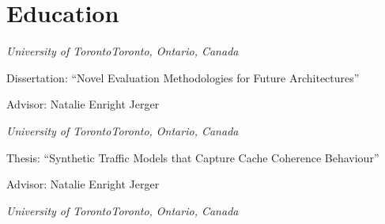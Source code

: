 \section{\sc Education}

{\textit{University of Toronto}}{\textit{Toronto, Ontario, Canada}}
{
  Dissertation: ``Novel Evaluation Methodologies for Future Architectures''

  Advisor:  Natalie Enright Jerger
}

{\textit{University of Toronto}}{\textit{Toronto, Ontario, Canada}}
{
  Thesis: ``Synthetic Traffic Models that Capture Cache Coherence Behaviour''

  Advisor:  Natalie Enright Jerger
}

{\textit{University of Toronto}}{\textit{Toronto, Ontario, Canada}}{}
